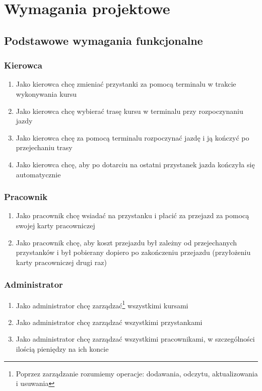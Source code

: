 \section{Wymagania projektowe}
\subsection{Podstawowe wymagania funkcjonalne}
\subsubsection{Kierowca}
\begin{enumerate}
  \item{Jako kierowca chcę zmieniać przystanki za pomocą terminalu w trakcie wykonywania kursu}\label{func_1}
  \item{Jako kierowca chcę wybierać trasę kursu w terminalu przy rozpoczynaniu jazdy}\label{func_2}
  \item{Jako kierowca chcę za pomocą terminalu rozpoczynać jazdę i ją kończyć po przejechaniu trasy}\label{func_3}
  \item{Jako kierowca chcę, aby po dotarciu na ostatni przystanek jazda kończyła się automatycznie}\label{func_4}
\end{enumerate}
\subsubsection{Pracownik}
\begin{enumerate}[resume]
  \item{Jako pracownik chcę wsiadać na przystanku i płacić za przejazd za pomocą swojej karty pracowniczej}\label{func_5}
  \item{Jako pracownik chcę, aby koszt przejazdu był zależny od przejechanych przystanków i był pobierany dopiero po zakończeniu przejazdu (przyłożeniu karty pracowniczej drugi raz)}\label{func_6}
\end{enumerate}
\subsubsection{Administrator}
\begin{enumerate}[resume]
  \item{Jako administrator chcę zarządzać\footnote{Poprzez zarządzanie rozumiemy operacje: dodawania, odczytu, aktualizowania i usuwania} wszystkimi kursami}\label{func_7}
  \item{Jako administrator chcę zarządzać wszystkimi przystankami}\label{func_8}
  \item{Jako administrator chcę zarządzać wszystkimi pracownikami, w szczególności ilością pieniędzy na ich koncie}\label{func_9}
\end{enumerate}
